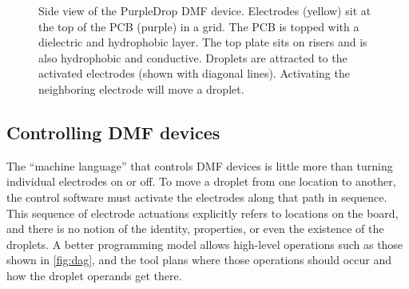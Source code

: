 \documentclass[sigconf, screen]{acmart}
\begin{document}
\begin{figure}
  \centering

  \caption{
    Side view of the PurpleDrop DMF device.
    Electrodes (yellow) sit at the top of the PCB (purple) in a grid.
    The PCB is topped with a dielectric and hydrophobic layer.
    The top plate sits on risers and is also hydrophobic and conductive.
    Droplets are attracted to the activated electrodes (shown with diagonal lines).
    Activating the neighboring electrode will move a droplet.
  }
  \label{fig:board-side}
\end{figure}

\subsection{Controlling DMF devices}
\label{sec:dmf-software}

The ``machine language'' that controls DMF devices is little more than turning individual electrodes on or off.
To move a droplet from one location to another, the control software must activate the electrodes along that path in sequence.
This sequence of electrode actuations explicitly refers to locations on the board, and there is no notion of the identity, properties, or even the existence of the droplets.
A better programming model allows high-level operations such as those shown in \autoref{fig:dag}, and the tool plans where those operations should occur and how the droplet operands get there.
\end{document}
